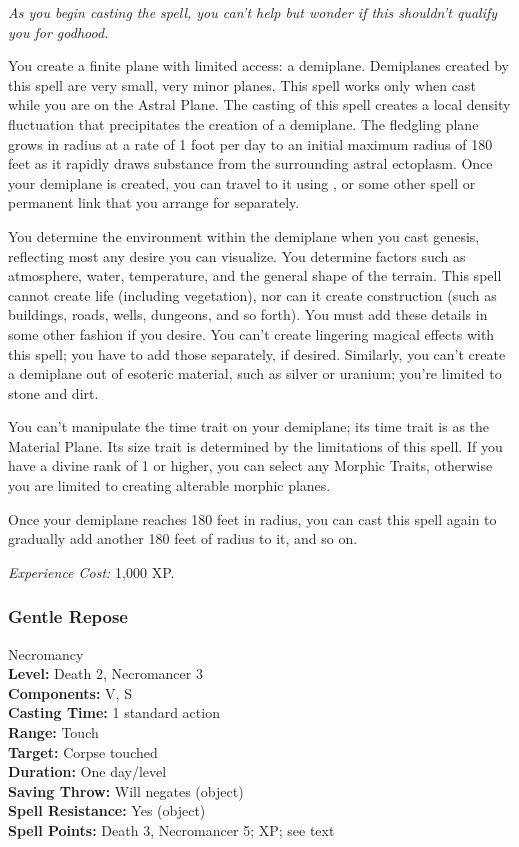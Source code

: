 \emph{As you begin casting the spell, you can't help but wonder if this shouldn't qualify you for godhood.}

You create a finite plane with limited access: a demiplane. 
Demiplanes created by this spell are very small, very minor planes. 
This spell works only when cast while you are on the Astral Plane. 
The casting of this spell creates a local density fluctuation that precipitates the creation of a demiplane. 
The fledgling plane grows in radius at a rate of 1 foot per day to an initial maximum radius of 180 feet as it rapidly draws substance from the surrounding astral ectoplasm. 
Once your demiplane is created, you can travel to it using ,  or some other spell or permanent link that you arrange for separately.

You determine the environment within the demiplane when you cast genesis, reflecting most any desire you can visualize. 
You determine factors such as atmosphere, water, temperature, and the general shape of the terrain. 
This spell cannot create life (including vegetation), nor can it create construction (such as buildings, roads, wells, dungeons, and so forth). 
You must add these details in some other fashion if you desire. 
You can't create lingering magical effects with this spell; you have to add those separately, if desired. 
Similarly, you can't create a demiplane out of esoteric material, such as silver or uranium; you're limited to stone and dirt. 

You can't manipulate the time trait on your demiplane; its time trait is as the Material Plane.
Its size trait is determined by the limitations of this spell.
If you have a divine rank of 1 or higher, you can select any Morphic Traits, otherwise you are limited to creating alterable morphic planes.

Once your demiplane reaches 180 feet in radius, you can cast this spell again to gradually add another 180 feet of radius to it, and so on.

\emph{Experience Cost:} 1,000 XP. 
\subsubsection{Gentle Repose}
\label{Spell:GentleRepose}
Necromancy
\\ \textbf{Level:} Death 2, Necromancer 3
\\ \textbf{Components:} V, S
\\ \textbf{Casting Time:} 1 standard action
\\ \textbf{Range:} Touch
\\ \textbf{Target:} Corpse touched
\\ \textbf{Duration:} One day/level
\\ \textbf{Saving Throw:} Will negates (object)
\\ \textbf{Spell Resistance:} Yes (object)
\\ \textbf{Spell Points:} Death 3, Necromancer 5; XP; see text

